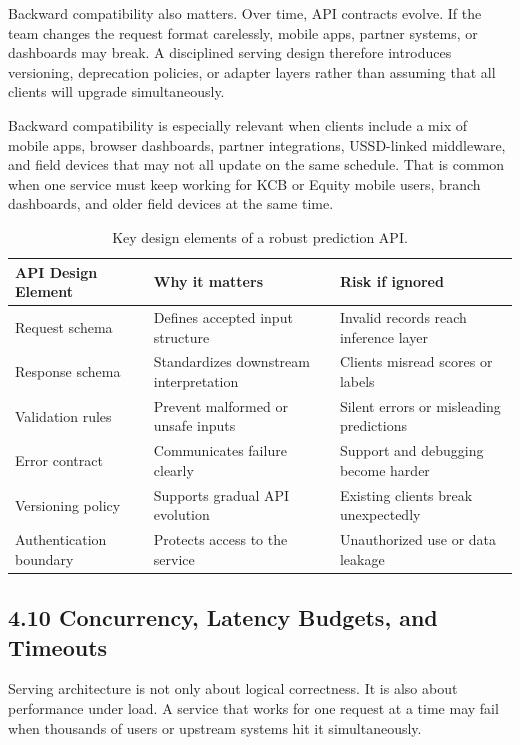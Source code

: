 \documentclass[12pt,a4paper]{article}
\begin{document}
Backward compatibility also matters. Over time, API contracts evolve. If the team changes the request format carelessly, mobile apps, partner systems, or dashboards may break. A disciplined serving design therefore introduces versioning, deprecation policies, or adapter layers rather than assuming that all clients will upgrade simultaneously.

Backward compatibility is especially relevant when clients include a mix of mobile apps, browser dashboards, partner integrations, USSD-linked middleware, and field devices that may not all update on the same schedule. That is common when one service must keep working for KCB or Equity mobile users, branch dashboards, and older field devices at the same time.

\begin{table}[h!]
\centering
\begin{tabular}{|p{3.5cm}|p{4.5cm}|p{6cm}|}
\hline
\textbf{API Design Element} & \textbf{Why it matters} & \textbf{Risk if ignored} \\ \hline
Request schema & Defines accepted input structure & Invalid records reach inference layer \\ \hline
Response schema & Standardizes downstream interpretation & Clients misread scores or labels \\ \hline
Validation rules & Prevent malformed or unsafe inputs & Silent errors or misleading predictions \\ \hline
Error contract & Communicates failure clearly & Support and debugging become harder \\ \hline
Versioning policy & Supports gradual API evolution & Existing clients break unexpectedly \\ \hline
Authentication boundary & Protects access to the service & Unauthorized use or data leakage \\ \hline
\end{tabular}
\caption{Key design elements of a robust prediction API.}
\end{table}

\subsection*{4.10 Concurrency, Latency Budgets, and Timeouts}
Serving architecture is not only about logical correctness. It is also about performance under load. A service that works for one request at a time may fail when thousands of users or upstream systems hit it simultaneously.
\end{document}
